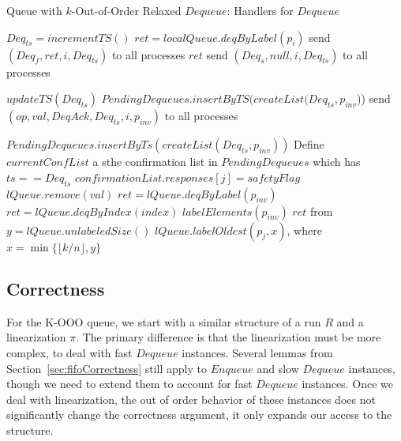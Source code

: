 \documentclass[a4paper,anonymous,USenglish]{lipics-v2021} %
\theoremstyle{definition}
\begin{document}
\begin{algorithm}
  \caption{Queue with $k$-Out-of-Order Relaxed $Dequeue$: Handlers for $Dequeue$}\label{alg:relaxed}
  \begin{algorithmic}[1]
      \State $Deq_{ts} = incrementTS()$
      \label{oooline:checkFast}
        \State $ret = localQueue.deqByLabel(p_i)$
        \State send $(Deq_f, ret, i, Deq_{ts})$ to all processes
        \State \Return $ret$ \label{oooline:fastDeqResponse}
      \Else
        \State send $(Deq_s, null, i, Deq_{ts})$ to all processes
      \EndIf
    \EndFunction

      \State $updateTS(Deq_{ts})$
        \State $PendingDequeues.insertByTS(createList(Deq_{ts}, p_{inv}$))
      \EndIf
      \State send $(op, val, DeqAck, Deq_{ts}, i, p_{inv})$ to all processes
    \EndFunction

        \State $PendingDequeues.insertByTs(createList(Deq_{ts}, p_{inv}))$
      \EndIf
      \State Define $currentConfList$ a sthe confirmation list in $PendingDequeues$ which has $ts == Deq_{ts}$
          \State $confirmationList.responses[j] = safetyFlag$
            \State $lQueue.remove(val)$
          \Else    
              \State $ret = lQueue.deqByLabel(p_{inv})$
            \Else 
              \State $ret = lQueue.deqByIndex(index)$
            \EndIf
            \State $labelElements(p_{inv})$
              \State \Return $ret$
            \EndIf
          \EndIf 
        \EndIf 
      \EndFor
      \EndFunction
%
       from \cite{TalmageWelch14}
      \State $y = lQueue.unlabeledSize()$
      \State $lQueue.labelOldest(p_j,x)$, where $x = \min\{\lfloor k/n\rfloor, y\}$
      \EndFunction
  \end{algorithmic}
\end{algorithm}



\subsection{Correctness}
For the K-OOO queue, we start with a similar structure of a run $R$ and a linearization $\pi$. The primary difference is that the linearization must be more complex, to deal with fast $Dequeue$ instances.  Several lemmas from Section~\ref{sec:fifoCorrectness} still apply to $Enqueue$ and slow $Dequeue$ instances, though we need to extend them to account for fast $Dequeue$ instances.  Once we deal with linearization, the out of order behavior of these instances does not significantly change the correctness argument, it only expands our access to the structure.
\end{document}
